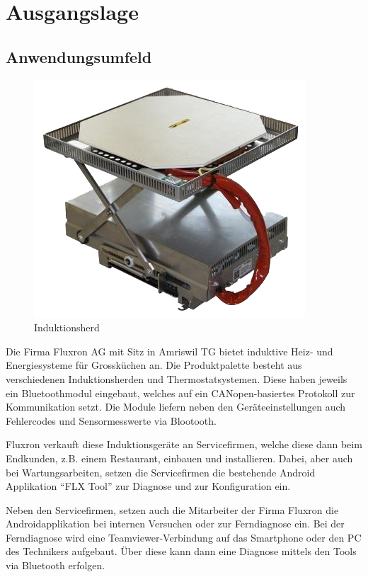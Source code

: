 
\section{Ausgangslage}
\label{sec:Ausgangslage}

\subsection{Anwendungsumfeld}
\label{subsec:Anwendungsumfeld}

\begin{figure}
	\includegraphics[scale=0.4]{analysis/res/einbaugeraete}
	\caption{Induktionsherd}
\end{figure}

Die Firma Fluxron AG mit Sitz in Amriswil TG bietet induktive Heiz- und Energiesysteme für Grossküchen an. Die Produktpalette besteht aus verschiedenen Induktionsherden und Thermostatsystemen. Diese haben jeweils ein Bluetoothmodul eingebaut, welches auf ein CANopen-basiertes Protokoll zur Kommunikation setzt. Die Module liefern neben den Geräteeinstellungen auch Fehlercodes und Sensormesswerte via Blootooth.

Fluxron verkauft diese Induktionsgeräte an Servicefirmen, welche diese dann beim Endkunden, z.B. einem Restaurant, einbauen und installieren. Dabei, aber auch bei Wartungsarbeiten, setzen die Servicefirmen die bestehende Android Applikation \enquote{FLX Tool} zur Diagnose und zur Konfiguration ein.

Neben den Servicefirmen, setzen auch die Mitarbeiter der Firma Fluxron die Androidapplikation bei internen Versuchen oder zur Ferndiagnose ein. Bei der Ferndiagnose wird eine Teamviewer-Verbindung auf das Smartphone oder den PC des Technikers aufgebaut. Über diese kann dann eine Diagnose mittels den Tools via Bluetooth erfolgen.

